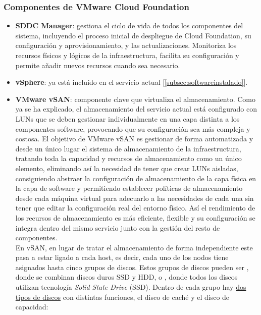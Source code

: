 \subsubsection{Componentes de VMware Cloud Foundation \cite{componentesCloudFound}}
\label{subsubsect:cfcomponents}
\begin{itemize}
    \item \textbf{SDDC Manager}: gestiona el ciclo de vida de todos los componentes del sistema, incluyendo el proceso inicial de despliegue de Cloud Foundation, su configuración y aprovisionamiento, y las actualizaciones. Monitoriza los recursos físicos y lógicos de la infraestructura, facilita su configuración y permite añadir nuevos recursos cuando sea necesario. 
    \item \textbf{vSphere}: ya está incluído en el servicio actual [\ref{subsec:softwareinstalado}].
    \item \textbf{VMware vSAN}: componente clave que virtualiza el almacenamiento. Como ya se ha explicado, el almacenamiento del servicio actual está configurado con LUNs que se deben gestionar individualmente en una capa distinta a los componentes software, provocando que su configuración sea más compleja y costosa. El objetivo de VMware vSAN es gestionar de forma automatizada y desde un único lugar el sistema de almacenamiento de la infraestructura, tratando toda la capacidad y recursos de almacenamiento como un único elemento, eliminando así la necesidad de tener que crear LUNs aisladas, consiguiendo abstraer la configuración de almacenamiento de la capa física en la capa de software y permitiendo establecer políticas de almacenamiento desde cada máquina virtual para adecuarlo a las necesidades de cada una sin tener que editar la configuración real del entorno físico. Así el rendimiento de los recursos de almacenamiento es más eficiente, flexible y su configuración se integra dentro del mismo servicio junto con la gestión del resto de componentes. \\
    En vSAN, en lugar de tratar el almacenamiento de forma independiente este pasa a estar ligado a cada host, es decir, cada uno de los nodos tiene asignados hasta cinco grupos de discos. Estos grupos de discos pueden ser , donde se combinan discos duros SSD y HDD, o , donde todos los discos utilizan tecnología \textit{Solid-State Drive} (SSD). Dentro de cada grupo hay \underline{dos tipos de discos} con distintas funciones, el disco de caché y el disco de capacidad\cite{operacionesVSAN}:

\end{itemize}
